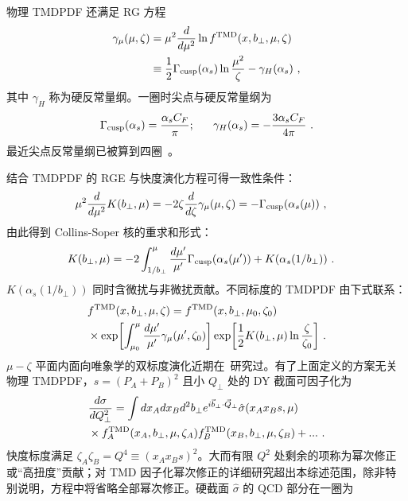 物理 TMDPDF 还满足 RG 方程
\begin{align}
	\gamma_\mu(\mu,\zeta)&=\mu^2\frac{d}{d\mu^2}\ln f^{\rm TMD}(x,b_\perp,\mu,\zeta) \nonumber \\
	&\equiv \frac{1}{2}\Gamma_{\rm cusp}(\alpha_s)\ln \frac{\mu^2}{\zeta}-\gamma_H(\alpha_s)  \ ,
\end{align}
其中 $\gamma_H$ 称为硬反常量纲。一圈时尖点与硬反常量纲为
\begin{align}\label{eq:ad_hard}
	\Gamma_{\rm cusp}(\alpha_s) =\frac{\alpha_s C_F}{\pi}; ~~~~~
	\gamma_H(\alpha_s) =-\frac{3\alpha_sC_F}{4\pi}  \ .
\end{align}
最近尖点反常量纲已被算到四圈~\cite{Henn:2019swt,vonManteuffel:2020vjv}。

结合 TMDPDF 的 RGE 与快度演化方程可得一致性条件：
\begin{align}
	\mu^2 \frac{d}{d\mu^2} K(b_\perp,\mu)
	&= -2 \zeta \frac{d}{d\zeta} \gamma_\mu(\mu,\zeta) =- \Gamma_{\rm cusp}(\alpha_s(\mu)) \ ,
\end{align}
由此得到 Collins-Soper 核的重求和形式：
\begin{align}
	K(b_\perp,\mu) &= -2 \int_{1/b_\perp}^\mu \frac{d\mu'}{\mu'} \Gamma_{\rm cusp}(\alpha_s(\mu')) + K(\alpha_s(1/b_\perp)) \ .
\end{align}
$K(\alpha_s(1/b_\perp))$ 同时含微扰与非微扰贡献。不同标度的 TMDPDF 由下式联系：
\begin{align} \label{eq:tmd_evolution}
	&f^{\rm TMD}(x, b_\perp, \mu, \zeta) = f^{\rm TMD}(x, b_\perp, \mu_0, \zeta_0) \\
	& \times\exp\biggl[ \int_{\mu_0}^\mu \frac{d\mu'}{\mu'} \gamma_\mu(\mu',\zeta_0) \biggr]
	\exp\biggl[ \frac12 K(b_\perp,\mu) \ln\frac{\zeta}{\zeta_0} \biggr]  \ . \nonumber
\end{align}
$\mu-\zeta$ 平面内面向唯象学的双标度演化近期在~\cite{Scimemi:2018xaf}研究过。有了上面定义的方案无关物理 TMDPDF，$s=(P_A+P_B)^2$ 且小 $Q_\perp$ 处的 DY 截面可因子化为
\begin{align}
	&\frac{d\sigma}{dQ_\perp^2}=\int dx_Adx_B d^2b_\perp e^{i\vec{b}_\perp \cdot \vec{Q}_\perp}\hat \sigma(x_Ax_Bs,\mu)\nonumber \\ &\times f_A^{\rm TMD}(x_A,b_\perp,\mu,\zeta_A)f_B^{\rm TMD}(x_B,b_\perp,\mu,\zeta_B)+ ... \ .
\end{align}
快度标度满足 $\zeta_A\zeta_B= Q^4\equiv(x_Ax_Bs)^2$。大而有限 $Q^2$ 处剩余的项称为幂次修正或``高扭度''贡献；对 TMD 因子化幂次修正的详细研究超出本综述范围，除非特别说明，方程中将省略全部幂次修正。硬截面 $\hat{\sigma}$ 的 QCD 部分在一圈为
